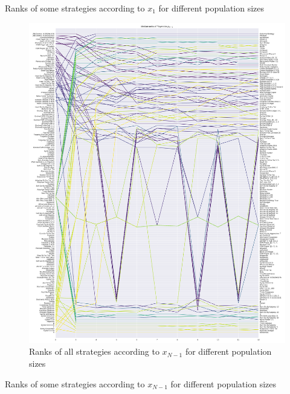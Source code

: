 \documentclass{article}
\begin{document}
\begin{table}[!hbtp]
    \centering
    \scriptsize
    
    \caption{Ranks of some strategies according to \(x_1\) for different
    population sizes}
    \label{tbl:ranks_v_size_invade}
\end{table}

\begin{figure}[!hbtp]
    \centering
    \includegraphics[height=.9\textheight]{./img/median_rank_vs_population_size_resist.pdf}
    \caption{Ranks of all strategies according to \(x_{N-1}\) for different
    population sizes}
    \label{fig:ranks_v_size_resist}
\end{figure}

\begin{table}[!hbtp]
    \centering
    \scriptsize
    
    \caption{Ranks of some strategies according to \(x_{N-1}\) for different
    population sizes}
    \label{tbl:ranks_v_size_resist}
\end{table}
\end{document}
